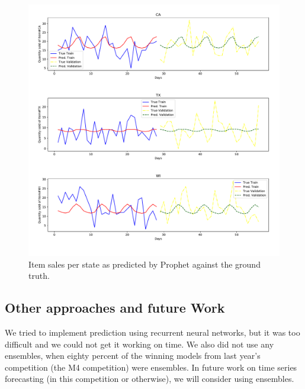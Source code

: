 \documentclass[12pt]{article}
\begin{document}
\begin{figure}[H]
  \centering
  \includegraphics[width=.8\linewidth]{pro-state}
  \caption{Item sales per state as predicted by Prophet against the ground truth.}
  \label{fig:pro-state-sales}
\end{figure}

\subsection{Other approaches and future Work}
We tried to implement prediction using recurrent neural networks, but it was too difficult and we could not get it working on time. We also did not use any ensembles, when eighty percent of the winning models from last year's competition (the M4 competition) were ensembles. In future work on time series forecasting (in this competition or otherwise), we will consider using ensembles.


\end{document}
